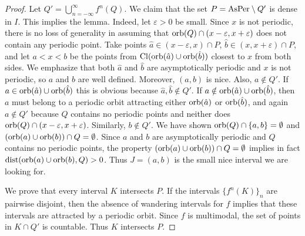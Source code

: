 \documentclass[12pt, psamsfonts, reqno]{amsart}
\begin{document}
\begin{proof}
 Let $Q'=\bigcup_{n=-\infty}^\infty f^n(Q)$.
 We claim that the set $P={\mathop{\rm AsPer}\nolimits}\setminus Q'$ is dense
 in $I$. This implies the lemma. Indeed, let ${\varepsilon}>0$ be
 small. Since $x$ is not periodic, there is no loss of generality in assuming that
 ${\mathop{\rm orb}\nolimits}(Q)\cap (x-{\varepsilon},x+{\varepsilon})$ does not contain any periodic point. Take points
 $\hat a\in (x-{\varepsilon},x)\cap P$, $\hat b\in (x,x+{\varepsilon})\cap P$, and let $a<x<b$ be the points from
 ${\mathop{\rm Cl}\nolimits}({\mathop{\rm orb}\nolimits}(\hat a)\cup {\mathop{\rm orb}\nolimits}(\hat b))$ closest to $x$ from both
 sides. We emphasize that both $\hat a$ and $\hat b$ are asymptotically periodic
 and $x$ is not periodic, so $a$ and $b$ are well defined. Moreover, $(a,b)$ is nice.
 Also, $a\notin Q'$. If $a\in {\mathop{\rm orb}\nolimits}(\hat a)\cup
 {\mathop{\rm orb}\nolimits}(\hat b)$ this is obvious because $\hat a, \hat b\notin Q'$.
 If $a\notin{\mathop{\rm orb}\nolimits}(\hat a)\cup {\mathop{\rm orb}\nolimits}(\hat
 b)$, then $a$  must belong to a periodic orbit attracting either ${\mathop{\rm orb}\nolimits}(\hat a)$ or  ${\mathop{\rm orb}\nolimits}(\hat
 b)$, and again $a\notin Q'$ because $Q$ contains no periodic points and
 neither does ${\mathop{\rm orb}\nolimits}(Q)\cap (x-{\varepsilon},x+{\varepsilon})$. Similarly, $b\notin
 Q'$. We have shown ${\mathop{\rm orb}\nolimits}(Q)\cap \{a,b\}=\emptyset$ and $({\mathop{\rm orb}\nolimits}(a)\cup{\mathop{\rm orb}\nolimits}(b))\cap
 Q=\emptyset$. Since $a$ and $b$ are asymptotically periodic and $Q$ contains
 no periodic points, the property $({\mathop{\rm orb}\nolimits}(a)\cup{\mathop{\rm orb}\nolimits}(b))\cap
 Q=\emptyset$ implies in fact ${\mathop{\rm dist}\nolimits}({\mathop{\rm orb}\nolimits}(a)\cup{\mathop{\rm orb}\nolimits}(b),Q)>0$.
 Thus $J=(a,b)$ is the small nice interval we are looking for.

 We prove that every interval $K$ intersects $P$. If the
 intervals $\{f^n(K)\}_n$ are pairwise disjoint, then
 the absence of wandering intervals for $f$ implies
 that these intervals are attracted by a periodic orbit.
 Since $f$ is multimodal, the set of points in $K \cap Q'$
 is countable. Thus $K$ intersects $P$.


\end{proof}
\end{document}
